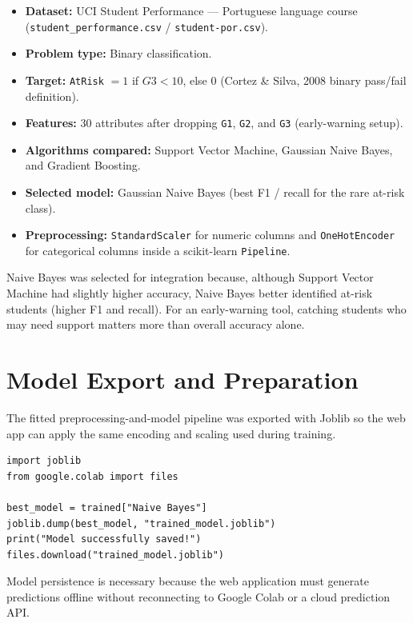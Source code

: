 \documentclass[11pt,a4paper]{article}
\begin{document}
\begin{itemize}[leftmargin=*]
  \item \textbf{Dataset:} UCI Student Performance --- Portuguese language course (\texttt{student\_performance.csv} / \texttt{student-por.csv}).
  \item \textbf{Problem type:} Binary classification.
  \item \textbf{Target:} \texttt{AtRisk} \(= 1\) if \(G3 < 10\), else \(0\) (Cortez \& Silva, 2008 binary pass/fail definition).
  \item \textbf{Features:} 30 attributes after dropping \texttt{G1}, \texttt{G2}, and \texttt{G3} (early-warning setup).
  \item \textbf{Algorithms compared:} Support Vector Machine, Gaussian Naive Bayes, and Gradient Boosting.
  \item \textbf{Selected model:} Gaussian Naive Bayes (best F1 / recall for the rare at-risk class).
  \item \textbf{Preprocessing:} \texttt{StandardScaler} for numeric columns and \texttt{OneHotEncoder} for categorical columns inside a scikit-learn \texttt{Pipeline}.
\end{itemize}

Naive Bayes was selected for integration because, although Support Vector Machine had slightly higher accuracy, Naive Bayes better identified at-risk students (higher F1 and recall). For an early-warning tool, catching students who may need support matters more than overall accuracy alone.

\section{Model Export and Preparation}

The fitted preprocessing-and-model pipeline was exported with Joblib so the web app can apply the same encoding and scaling used during training.

\begin{verbatim}
import joblib
from google.colab import files

best_model = trained["Naive Bayes"]
joblib.dump(best_model, "trained_model.joblib")
print("Model successfully saved!")
files.download("trained_model.joblib")
\end{verbatim}

Model persistence is necessary because the web application must generate predictions offline without reconnecting to Google Colab or a cloud prediction API.
\end{document}
